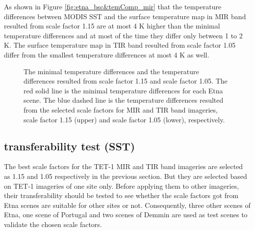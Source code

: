 \noindent As shown in Figure \ref{fig:etna_bsc&temComp_mir} that the temperature differences between MODIS SST and the surface temperature map in MIR band resulted from scale factor 1.15 are at most 4 K higher than the minimal temperature differences and at most of the time they differ only between 1 to 2 K. The surface temperature map in TIR band resulted from scale factor 1.05 differ from the smallest temperature differences at most 4 K as well.\\

\begin{figure}[!htbp]
\centering
{}
\hspace{0.5in}
\caption{The minimal temperature differences and the temperature differences resulted from scale factor 1.15 and scale factor 1.05. The red solid line is the minimal temperature differences for each Etna scene. The blue dashed line is the temperature differences resulted from the selected scale factors for MIR and TIR band imageries, scale factor 1.15 (upper) and scale factor 1.05 (lower), respectively.}
\label{fig:etna_bsc&temComp}
\end{figure}



\subsection{transferability test (SST)}
The best scale factors for the TET-1 MIR and TIR band imageries are selected as 1.15 and 1.05 respectively in the previous section. But they are selected based on TET-1 imageries of one site only. Before applying them to other imageries, their transferability should be tested to see whether the scale factors got from Etna scenes are suitable for other sites or not. Consequently, three other scenes of Etna, one scene of Portugal and two scenes of Demmin are used as test scenes to validate the chosen scale factors.\\

